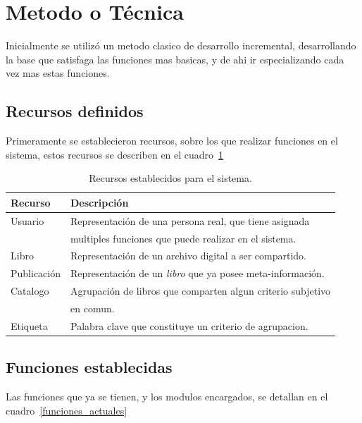 \documentclass[letter,12pt]{article}
\begin{document}
\section{Metodo o Técnica}
Inicialmente se utilizó un metodo clasico de desarrollo incremental, desarrollando la base que satisfaga las funciones
mas basicas, y de ahi ir especializando cada vez mas estas funciones.

\subsection{Recursos definidos}
Primeramente se establecieron recursos, sobre los que realizar funciones en el sistema, estos recursos se describen en el
cuadro~\ref{recursos_actuales}

\begin{table}
\begin{tabular}{l|l}
Recurso & Descripción \\
\hline
Usuario     & Representación de una persona real, que tiene asignada    \\
            & multiples funciones que puede realizar en el sistema.     \\
Libro       & Representación de un archivo digital a ser compartido.    \\
Publicación & Representación de un \emph{libro} que ya posee meta-información. \\
Catalogo    & Agrupación de libros que comparten algun criterio subjetivo \\
		    & en comun.                                                 \\
Etiqueta    & Palabra clave que constituye un criterio de agrupacion.   \\
\end{tabular}
\caption{Recursos establecidos para el sistema.}
\label{recursos_actuales}
\end{table}

\subsection{Funciones establecidas}
Las funciones que ya se tienen, y los modulos encargados, se detallan en el cuadro~\ref{funciones_actuales}
\end{document}
